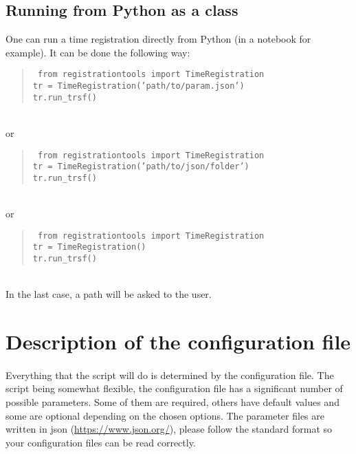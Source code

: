 \documentclass[10pt,a4paper]{book}
\newenvironment{code}[1]{\mbox{}\\[1ex]\hspace*{-#1cm}\begin{minipage}{150mm}\begin{quote}\tt}{\end{quote}\end{minipage}\mbox{}\\[1ex]}
\begin{document}
\subsection{Running from Python as a class}
One can run a time registration directly from Python (in a notebook for example). It can be done the following way:
\begin{code}{0.8}
from registrationtools import TimeRegistration\\
tr = TimeRegistration('path/to/param.json')\\
tr.run\_trsf()
\end{code}
or
\begin{code}{0.8}
from registrationtools import TimeRegistration\\
tr = TimeRegistration('path/to/json/folder')\\
tr.run\_trsf()
\end{code}
or
\begin{code}{0.8}
from registrationtools import TimeRegistration\\
tr = TimeRegistration()\\
tr.run\_trsf()
\end{code}
In the last case, a path will be asked to the user.



\section{Description of the configuration file}
\paragraph{}Everything that the script will do is determined by the configuration file. The script being somewhat flexible, the configuration file has a significant number of possible parameters. Some of them are required, others have default values and some are optional depending on the chosen options. The parameter files are written in json (\url{https://www.json.org/}), please follow the standard format so your configuration files can be read correctly.
\end{document}
